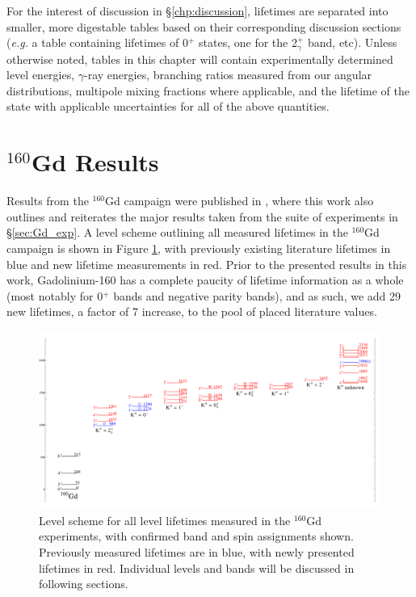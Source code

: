 For the interest of discussion in \S \ref{chp:discussion}, lifetimes are separated into smaller, more digestable tables based on their corresponding discussion sections (\textit{e.g.} a table containing lifetimes of 0$^+$ states, one for the 2$^+_\gamma$ band, etc). Unless otherwise noted, tables in this chapter will contain experimentally determined level energies, $\gamma$-ray energies, branching ratios measured from our angular distributions, multipole mixing fractions where applicable, and the lifetime of the state with applicable uncertainties for all of the above quantities.
\section{$^{160}$Gd Results}
Results from the $^{160}$Gd campaign were published in \cite{Lesher_160Gd0s}, where this work also outlines and reiterates the major results taken from the suite of experiments in \S \ref{sec:Gd_exp}. A level scheme outlining all measured lifetimes in the $^{160}$Gd campaign is shown in Figure \ref{fig:160Gd_All}, with previously existing literature lifetimes in blue and new lifetime measurements in red. Prior to the presented results in this work, Gadolinium-160 has a complete paucity of lifetime information as a whole (most notably for 0$^+$ bands and negative parity bands), and as such, we add 29 new lifetimes, a factor of 7 increase, to the pool of placed literature values.

\begin{landscape}
\begin{center}
\begin{figure}[h!]
\includegraphics[height=0.85\textheight]{160Gd_All.pdf}
\caption{Level scheme for all level lifetimes measured in the $^{160}$Gd experiments, with confirmed band and spin assignments shown. Previously measured lifetimes are in blue, with newly presented lifetimes in red. Individual levels and bands will be discussed in following sections.
\label{fig:160Gd_All}}
\end{figure}
\end{center}
\end{landscape}

